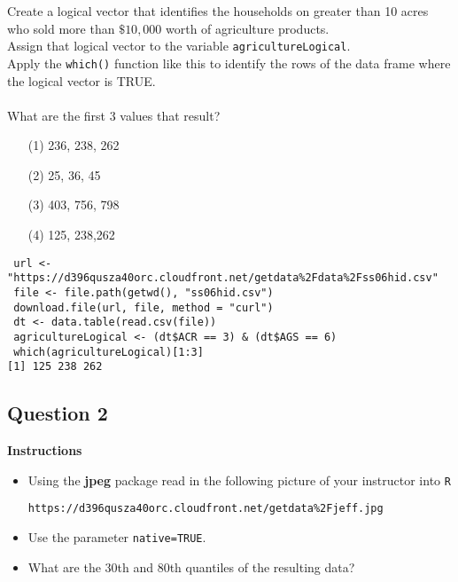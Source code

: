 \documentclass[]{article}
\begin{document}
\noindent Create a logical vector that identifies the households on greater than 10 acres who sold more than $\$10,000$ worth of agriculture products. 
\\
Assign that logical vector to the variable \texttt{agricultureLogical}. \\ 
Apply the \texttt{which()} function like this to identify the rows of the data frame where the logical vector is TRUE. \\
\\
What are the first 3 values that result?
\begin{itemize}
\item[(1)] 236, 238, 262
\item[(2)] 25, 36, 45
\item[(3)] 403, 756, 798
\item[(4)] 125, 238,262
\end{itemize}
\begin{framed}
\begin{verbatim}
 url <- "https://d396qusza40orc.cloudfront.net/getdata%2Fdata%2Fss06hid.csv"
 file <- file.path(getwd(), "ss06hid.csv")
 download.file(url, file, method = "curl")
 dt <- data.table(read.csv(file))
 agricultureLogical <- (dt$ACR == 3) & (dt$AGS == 6)
 which(agricultureLogical)[1:3]
[1] 125 238 262
\end{verbatim}
\end{framed}
\newpage
\subsection*{Question 2}
\textbf{Instructions}
\begin{itemize}
\item Using the \textbf{jpeg} package read in the following picture of your instructor into \texttt{R} 

\begin{verbatim}
https://d396qusza40orc.cloudfront.net/getdata%2Fjeff.jpg 
\end{verbatim}

\item Use the parameter \texttt{native=TRUE}. 
\item What are the 30th and 80th quantiles of the resulting data? 

\end{itemize}
\end{document}
